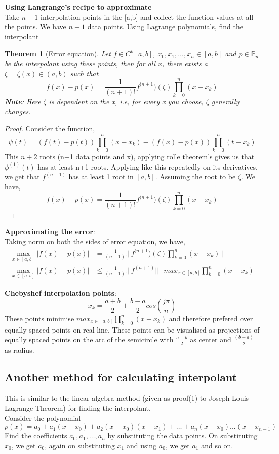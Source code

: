 \documentclass{article}
\newtheorem*{theorem}{Theorem}
\begin{document}
	\noindent\textbf{Using Langrange's recipe to approximate}\\
	Take $n+1$ interpolation points in the [a,b] and collect the function values at all the points. We have $n+1$ data points. Using Lagrange polynomials, find the interpolant\\
		

	\begin{theorem}[Error equation]
		Let $f\in C^k[a,b]$, $x_0,x_1,\hdots,x_n \in [a,b]$ and $p\in \mathbb{P}_n$ be the interpolant using these points, then for all $x$, there exists a $\zeta = \zeta(x) \in (a,b)$ such that
		\[f(x)-p(x) = \frac{1}{(n+1)!}f^{(n+1})(\zeta)\prod_{k=0}^n(x-x_k)\]
		\textbf{Note}: Here $\zeta$ is dependent on the x, i.e, for every x you choose, $\zeta$ generally changes.\\
	\end{theorem}

	\begin{proof}
		Consider the function,
		\[\psi(t)=(f(t)- p(t))\prod_{k=0}^n(x-x_k) - (f(x)-p(x))\prod_{k=0}^n(t-x_k)\]
		This $n+2$ roots (n+1 data points and x), applying rolle theorem's gives us that $\phi^{(1)}(t)$ has at least n+1 roots. Applying like this repeatedly on its derivatives, we get that $f^{(n+1)}$ has at least 1 root in $[a,b]$. Assuming the root to be $\zeta$. We have,
		\[f(x)-p(x) = \frac{1}{(n+1)!}f^{(n+1})(\zeta)\prod_{k=0}^n(x-x_k)\]
	\end{proof}


	\noindent\textbf{Approximating the error}:\\
	Taking norm on both the sides of error equation, we have,
	\begin{align}
		\max_{x\in [a,b]} |f(x)-p(x)| &= \frac{1}{(n+1)!}||f^{(n+1})(\zeta)\prod_{k=0}^n(x-x_k)||\\
		\max_{x\in [a,b]} |f(x)-p(x)| &\leq \frac{1}{(n+1)!} ||f^{(n+1)}||\text{ }max_{x \in [a,b]}\prod_{k=0}^n(x-x_k)
	\end{align}

	\noindent\textbf{Chebyshef interpolation points}:
		\[x_k= \frac{a+b}{2}+\frac{b-a}{2}cos\left(\frac{j\pi}{n}\right)\]
	\noindent These points minimise $max_{x \in [a,b]}\prod_{k=0}^n(x-x_k)$ and therefore prefered over equally spaced points on real line. These points can be visualised as projections of equally spaced points on the arc of the semicircle with $\frac{a+b}{2}$ as center and $\frac{(b-a)}{2}$ as radius.



\subsection{Another method for calculating interpolant}
	This is similar to the linear algebra method (given as proof(1) to Joseph-Louis Lagrange Theorem) for finding the interpolant.\\
	Consider the polynomial 
	\[p(x)= a_0 +a_1 (x-x_0) + a_2(x-x_0)(x-x_1)+ \hdots +a_n(x-x_0)...(x-x_{n-1})\]
	Find the coefficients $a_0, a_1, \hdots, a_n$ by substituting the data points. On substituting $x_0$, we get $a_0$, again on substituting $x_1$ and using $a_0$, we get $a_1$ and so on.
\end{document}
